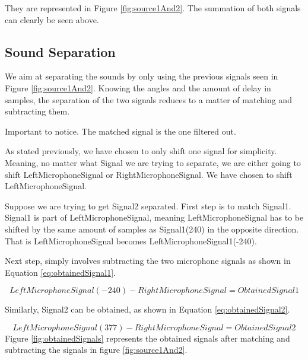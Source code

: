 They are represented in Figure \ref{fig:source1And2}. The summation of both signals can clearly 
be seen above.
\newpage
\subsection*{Sound Separation}
We aim at separating the sounds by only using the previous signals seen in Figure \ref{fig:source1And2}.
Knowing the angles and the amount of delay in samples, the separation of the two signals reduces to
a matter of matching and subtracting them. 

Important to notice. The matched signal is the one filtered out.

As stated previously, we have chosen to only shift one signal for simplicity. Meaning, no matter
what Signal we are trying to separate, we are either going to shift LeftMicrophoneSignal or 
RightMicrophoneSignal. We have chosen to shift LeftMicrophoneSignal.

Suppose we are trying to get Signal2 separated.
First step is to match Signal1. Signal1 is part of LeftMicrophoneSignal, meaning LeftMicrophoneSignal
has to be shifted by the same amount of samples as Signal1(240) in the opposite direction. That is 
LeftMicrophoneSignal becomes LeftMicrophoneSignal1(-240).

Next step, simply involves subtracting the two microphone signals as shown in Equation \ref{eq:obtainedSignal1}.

\begin{equation}
	LeftMicrophoneSignal(-240) - RightMicrophoneSignal = ObtainedSignal1
	\label{eq:obtainedSignal1}
\end{equation}

Similarly, Signal2 can be obtained, as shown in Equation \ref{eq:obtainedSignal2}.

\begin{equation}
	LeftMicrophoneSignal(377) - RightMicrophoneSignal = ObtainedSignal2
	\label{eq:obtainedSignal2}
\end{equation}
\newpage
Figure \ref{fig:obtainedSignals} represents the obtained signals after matching and subtracting the 
signals in figure \ref{fig:source1And2}.

